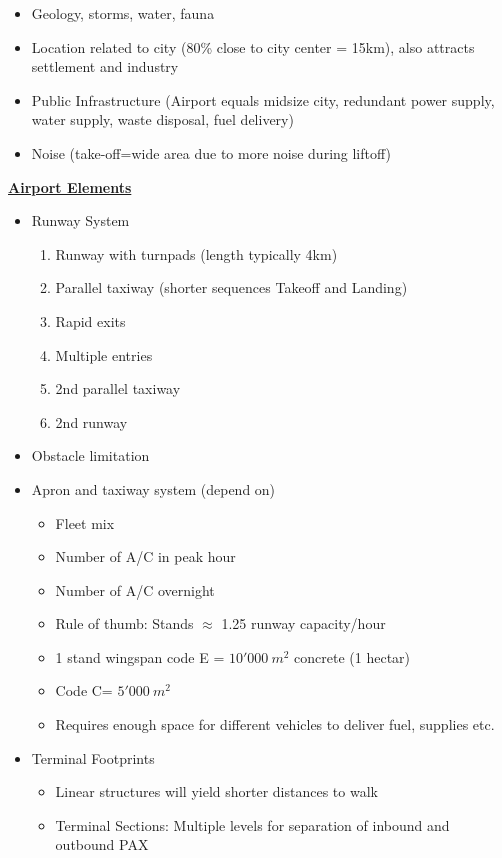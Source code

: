 \documentclass[9pt, landscape, fleqn]{scrartcl}
\begin{document}
\begin{multicols*}{3}
\begin{itemize}
    \item Geology, storms, water, fauna 
    \item Location related to city (80\% close to city center = 15km), also attracts settlement and industry 
    \item Public Infrastructure (Airport equals midsize city, redundant power supply, water supply, waste disposal, fuel delivery)
    \item Noise (take-off=wide area due to more noise during liftoff)
\end{itemize}
\underline{\textbf{Airport Elements}}
\begin{itemize}
    \item Runway System
    \begin{enumerate}
        \item Runway with turnpads (length typically 4km)
        \item Parallel taxiway (shorter sequences Takeoff and Landing)
        \item Rapid exits 
        \item Multiple entries 
        \item 2nd parallel taxiway 
        \item 2nd runway
    \end{enumerate}
    \item Obstacle limitation 
    \item Apron and taxiway system (depend on)
    \begin{itemize}
        \item Fleet mix 
        \item Number of A/C in peak hour 
        \item Number of A/C overnight 
        \item Rule of thumb: Stands $\approx$ 1.25 runway capacity/hour 
        \item 1 stand wingspan code E = $10'000~m^2$ concrete (1 hectar)
        \item Code C= $5'000~m^2$
        \item Requires enough space for different vehicles to deliver fuel, supplies etc.
    \end{itemize}
    \item Terminal Footprints
    \begin{itemize}
        \item Linear structures will yield shorter distances to walk 
        \item Terminal Sections: Multiple levels for separation of inbound and outbound PAX 

\end{itemize}
\end{itemize}
\end{multicols*}
\end{document}
